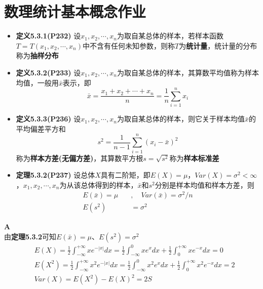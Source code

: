 \documentclass[a4paper]{ctexart}    %
\begin{document}
	\section{数理统计基本概念作业}
	\begin{tcolorbox}
		[
			colframe=blue!25,
			colback=blue!10,
			coltitle=blue!20!black,  
			fonttitle=\bfseries,
			adjusted title=Formula Or Theorem:
		]
	\begin{itemize}
		\item \textbf{定义5.3.1(P232)} 设$ x_1, x_2, \cdots, x_n $为取自某总体的样本，若样本函数$ T = T(x_1, x_2, \cdots, x_n) $中不含有任何未知参数，则称$ T $为\textbf{统计量}，统计量的分布称为\textbf{抽样分布}
		\item \textbf{定义5.3.2(P233)} 设$ x_1, x_2, \cdots, x_n $为取自某总体的样本，其算数平均值称为样本均值，一般用$ \bar{x} $表示，即
		\begin{equation*}
			\bar{x} = \frac{x_1 + x_2 + \cdots + x_n}{n} = \frac{1}{n}\sum\limits_{i=1}^{n}x_i
		\end{equation*}
		\item \textbf{定义5.3.3(P236)} 设$ x_1, x_2, \cdots, x_n $为取自某总体的样本，则它关于样本均值$ \bar{x} $的平均偏差平方和
		\begin{equation}
			s^2 = \frac{1}{n-1}\sum\limits_{i=1}^{n}(x_i - \bar{x})^2
		\end{equation}
		称为\textbf{样本方差}\textbf{(无偏方差)}，其算数平方根$ s = \sqrt{s^2} $称为\textbf{样本标准差}
		\item \textbf{定理5.3.2(P237)} 设总体$ X $具有二阶矩，即$ E(X) = \mu $，$ Var(X) = \sigma^2 < \infty $，$ x_1, x_2, \cdots, x_n $为从该总体得到的样本，$ \bar{x} $和$ s^2 $分别是样本均值和样本方差，则
		\begin{equation*}
			\begin{split}
				E(\bar{x}) = \mu \quad &, \quad Var(\bar{x}) = \sigma^2 / n \\
				E(s^2) &= \sigma^2
			\end{split}
		\end{equation*}
	\end{itemize}
	\end{tcolorbox}
	 \quad \textbf{A}\\
	由\textbf{定理5.3.2}可知$E(\bar{x})=\mu$、$E(s^2)=\sigma^2$
	\begin{equation*}
		\begin{split}
			&E(X) = \frac12\int_{-\infty}^{+\infty}xe^{-|x|}dx = \frac12\int_{-\infty}^{0}xe^{x}dx + \frac12\int_{0}^{+\infty}xe^{-x}dx = 0 \\
			&E(X^2) = \frac12\int_{-\infty}^{+\infty} x^2e^{-|x|}dx = \frac12\int_{-\infty}^{0} x^2e^{x}dx + \frac12\int_{0}^{+\infty}x^2e^{-x}dx = 2\\
			&Var(X) = E(X^2) -E(X)^2 = 2S
		\end{split}
	\end{equation*}
\end{document}
